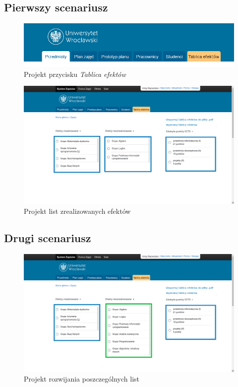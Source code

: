 \documentclass{article}
\begin{document}
\subsection{Pierwszy scenariusz}
\begin{figure}[H]
	\begin{center}
		\caption{Projekt przycisku \textit{Tablica efektów}}
		\includegraphics[scale=0.45]{te.png}
	\end{center}
\end{figure}

\begin{figure}[H]
	\begin{center}
		\caption{Projekt list zrealizowanych efektów}
		\includegraphics[scale=0.23]{tabl.png}
	\end{center}
\end{figure}

\subsection{Drugi scenariusz}
\begin{figure}[H]
	\begin{center}
		\caption{Projekt rozwijania poszczególnych list}
		\includegraphics[scale=0.23]{rozwin.png}
	\end{center}
\end{figure}
\end{document}
